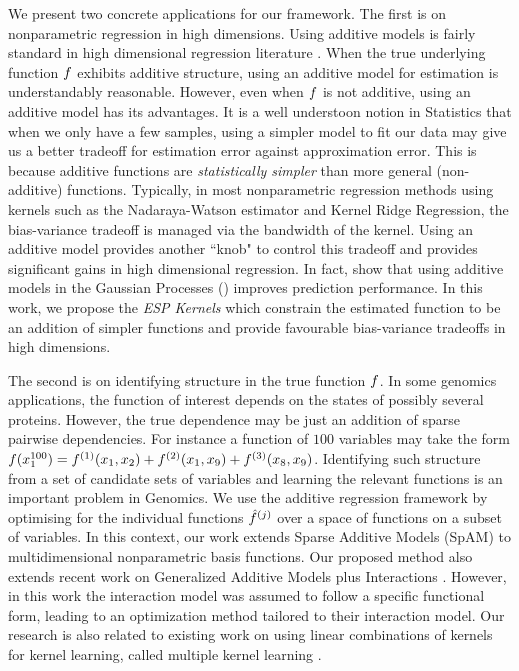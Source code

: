We present two concrete applications for our framework.
The first is on nonparametric regression in high dimensions.
Using additive models is fairly standard in high dimensional regression
literature
\cite{hastie90gam,ravikumar09spam,lafferty05rodeo}. 
When the true underlying function $f$ exhibits additive structure, using an additive
model for estimation is understandably reasonable. However, even when $f$ is
not additive, using an additive model has its advantages. 
It is a well understoon notion in Statistics that when we only have a few samples, using a
simpler model to fit our data may give us a better tradeoff for estimation error  
against approximation error. 
This is because additive functions are \emph{statistically simpler}
than more general (non-additive) functions.
Typically, in most nonparametric regression methods using kernels such as the
Nadaraya-Watson
 estimator and Kernel Ridge Regression, the bias-variance tradeoff
is managed via the bandwidth of the kernel. 
Using an additive model
provides another ``knob" to control this tradeoff and provides significant gains
in high dimensional regression. In fact, \citet{duvenaud11additivegps}
show that using additive models in the Gaussian Processes (\gp)
improves prediction performance.
In this work, we propose the \emph{ESP Kernels} which constrain the estimated
function to be an addition of simpler functions and provide favourable
bias-variance tradeoffs in high dimensions.

The second is on identifying structure in the true function $f$.
In some genomics applications, the function of interest depends on the states of
possibly several proteins. However, the true dependence may be just an addition
of sparse pairwise dependencies. For instance a function of $100$ variables may
take the form $f(x_1^{100}) = f^{(1)}(x_1, x_2) + f^{(2)}(x_1, x_9) + 
f^{(3)}(x_8,x_9)$. Identifying such structure from a set of candidate sets of
variables and learning the relevant
functions is an important problem in Genomics.
We use the additive regression framework by optimising for the individual
functions $\hat{f}^{(j)}$ over a space of functions on a subset of variables.
In this context, our work extends Sparse Additive Models (SpAM) \citep{ravikumar09spam} 
to multidimensional nonparametric basis functions.
Our proposed method also extends recent work on 
Generalized Additive Models plus Interactions \citep{intelligible:2013}.
However, in this work the interaction model was assumed to follow a specific functional form,
leading to an optimization method tailored to their interaction model.
Our research is also related to existing work on 
using linear combinations of kernels for kernel learning,
called multiple kernel learning \citep{mkl-review:2011}.

